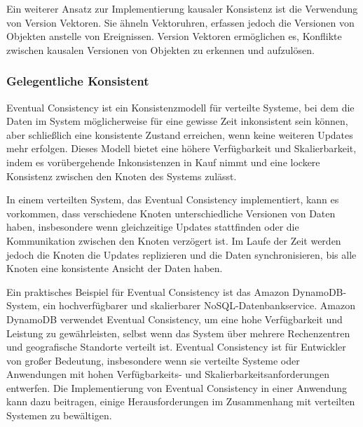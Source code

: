 \documentclass[../vs-script-first-v01.tex]{subfiles}
\begin{document}
Ein weiterer Ansatz zur Implementierung kausaler Konsistenz ist die Verwendung von Version Vektoren. Sie ähneln Vektoruhren, erfassen jedoch die Versionen von Objekten anstelle von Ereignissen. Version Vektoren ermöglichen es, Konflikte zwischen kausalen Versionen von Objekten zu erkennen und aufzulösen.

\subsubsection{Gelegentliche Konsistent}
Eventual Consistency ist ein Konsistenzmodell für verteilte Systeme, bei dem die Daten im System möglicherweise für eine gewisse Zeit inkonsistent sein können, aber schließlich eine konsistente Zustand erreichen, wenn keine weiteren Updates mehr erfolgen. Dieses Modell bietet eine höhere Verfügbarkeit und Skalierbarkeit, indem es vorübergehende Inkonsistenzen in Kauf nimmt und eine lockere Konsistenz zwischen den Knoten des Systems zulässt.

In einem verteilten System, das Eventual Consistency implementiert, kann es vorkommen, dass verschiedene Knoten unterschiedliche Versionen von Daten haben, insbesondere wenn gleichzeitige Updates stattfinden oder die Kommunikation zwischen den Knoten verzögert ist. Im Laufe der Zeit werden jedoch die Knoten die Updates replizieren und die Daten synchronisieren, bis alle Knoten eine konsistente Ansicht der Daten haben.

Ein praktisches Beispiel für Eventual Consistency ist das Amazon DynamoDB-System, ein hochverfügbarer und skalierbarer NoSQL-Datenbankservice. Amazon DynamoDB verwendet Eventual Consistency, um eine hohe Verfügbarkeit und Leistung zu gewährleisten, selbst wenn das System über mehrere Rechenzentren und geografische Standorte verteilt ist.
Eventual Consistency ist für Entwickler von großer Bedeutung, insbesondere wenn sie verteilte Systeme oder Anwendungen mit hohen Verfügbarkeits- und Skalierbarkeitsanforderungen entwerfen. Die Implementierung von Eventual Consistency in einer Anwendung kann dazu beitragen, einige Herausforderungen im Zusammenhang mit verteilten Systemen zu bewältigen.
\end{document}
